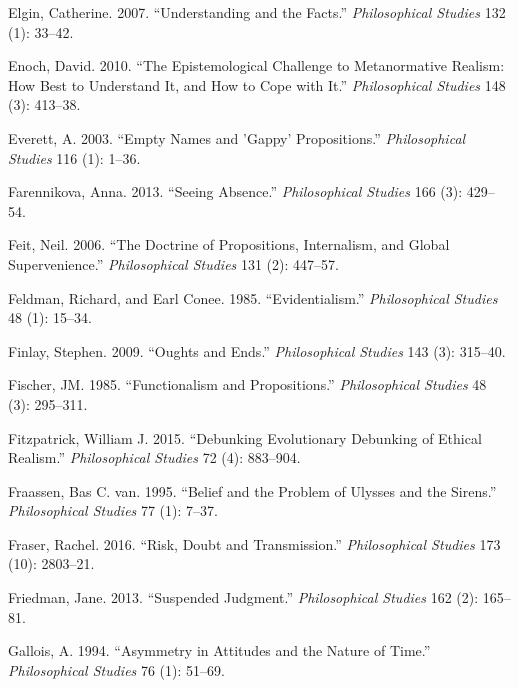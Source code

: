 \documentclass[
  10pt,
  letterpaper,
  DIV=11,
  numbers=noendperiod,
  twoside]{scrartcl}
\newlength{\cslhangindent}
\newenvironment{CSLReferences}[2] %
 {\begin{list}{}{%
  \setlength{\itemindent}{0pt}
  \setlength{\leftmargin}{0pt}
  \setlength{\parsep}{0pt}
  \ifodd #1
   \setlength{\leftmargin}{\cslhangindent}
   \setlength{\itemindent}{-1\cslhangindent}
  \fi
  \setlength{\itemsep}{#2\baselineskip}}}
 {\end{list}}
\begin{document}
\begin{CSLReferences}{1}{0}
Elgin, Catherine. 2007. {``Understanding and the Facts.''}
\emph{Philosophical Studies} 132 (1): 33--42.

Enoch, David. 2010. {``The Epistemological Challenge to Metanormative
Realism: How Best to Understand It, and How to Cope with It.''}
\emph{Philosophical Studies} 148 (3): 413--38.

Everett, A. 2003. {``Empty Names and 'Gappy' Propositions.''}
\emph{Philosophical Studies} 116 (1): 1--36.

Farennikova, Anna. 2013. {``Seeing Absence.''} \emph{Philosophical
Studies} 166 (3): 429--54.

Feit, Neil. 2006. {``The Doctrine of Propositions, Internalism, and
Global Supervenience.''} \emph{Philosophical Studies} 131 (2): 447--57.

Feldman, Richard, and Earl Conee. 1985. {``Evidentialism.''}
\emph{Philosophical Studies} 48 (1): 15--34.

Finlay, Stephen. 2009. {``Oughts and Ends.''} \emph{Philosophical
Studies} 143 (3): 315--40.

Fischer, JM. 1985. {``Functionalism and Propositions.''}
\emph{Philosophical Studies} 48 (3): 295--311.

Fitzpatrick, William J. 2015. {``Debunking Evolutionary Debunking of
Ethical Realism.''} \emph{Philosophical Studies} 72 (4): 883--904.

Fraassen, Bas C. van. 1995. {``Belief and the Problem of Ulysses and the
Sirens.''} \emph{Philosophical Studies} 77 (1): 7--37.

Fraser, Rachel. 2016. {``Risk, Doubt and Transmission.''}
\emph{Philosophical Studies} 173 (10): 2803--21.

Friedman, Jane. 2013. {``Suspended Judgment.''} \emph{Philosophical
Studies} 162 (2): 165--81.

Gallois, A. 1994. {``Asymmetry in Attitudes and the Nature of Time.''}
\emph{Philosophical Studies} 76 (1): 51--69.


\end{CSLReferences}
\end{document}

